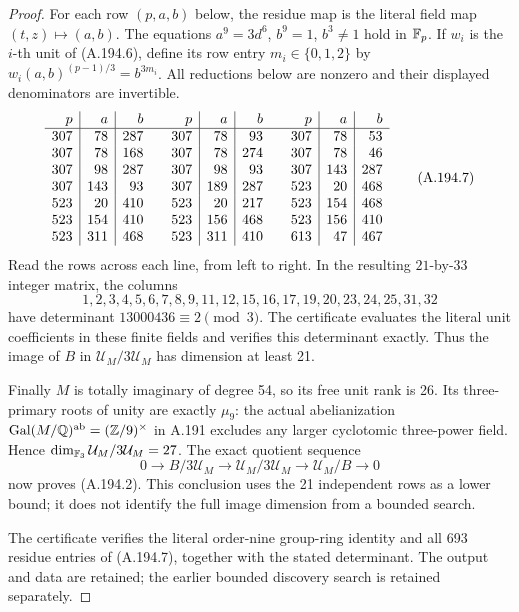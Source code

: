 \begin{proof}
For each row \((p,a,b)\) below, the residue map is the
literal field map \((t,z)\mapsto(a,b)\).
The equations \(a^9=3d^6\), \(b^9=1\), \(b^3\ne1\)
hold in \(\mathbb F_p\).  If \(w_i\) is the \(i\)-th unit
of (A.194.6), define its row entry \(m_i\in\{0,1,2\}\)
by
\(w_i(a,b)^{(p-1)/3}=b^{3m_i}\).
All reductions below are nonzero and their displayed
denominators are invertible.
\[
\begin{array}{r|r|r@{\qquad}r|r|r@{\qquad}r|r|r}
 p&a&b&p&a&b&p&a&b\\\hline
307&78&287&307&78&93&307&78&53\\
307&78&168&307&78&274&307&78&46\\
307&98&287&307&98&93&307&143&287\\
307&143&93&307&189&287&523&20&468\\
523&20&410&523&20&217&523&154&468\\
523&154&410&523&156&468&523&156&410\\
523&311&468&523&311&410&613&47&467
\end{array}
\tag{A.194.7}
\]
Read the rows across each line, from left to right.
In the resulting \(21\)-by-\(33\) integer matrix, the
columns
\[
 1,2,3,4,5,6,7,8,9,11,12,15,16,17,19,20,23,24,25,31,32
\tag{A.194.8}
\]
have determinant \(13000436\equiv2\pmod3\).
The certificate evaluates the literal unit coefficients in
these finite fields and verifies this determinant exactly.
Thus the image of \(B\) in \(\mathcal U_M/3\mathcal U_M\)
has dimension at least 21.

Finally \(M\) is totally imaginary of degree 54, so its
free unit rank is 26.  Its three-primary roots of unity
are exactly \(\mu_9\): the actual abelianization
\(\operatorname{Gal}(M/\mathbb Q)^{\rm ab}=(\mathbb Z/9)^\times\)
in A.191 excludes any larger cyclotomic three-power field.
Hence \(\dim_{\mathbb F_3}\mathcal U_M/3\mathcal U_M=27\).
The exact quotient sequence
\[
 0\longrightarrow B/3\mathcal U_M
 \longrightarrow\mathcal U_M/3\mathcal U_M
 \longrightarrow\mathcal U_M/B\longrightarrow0
\tag{A.194.9}
\]
now proves (A.194.2).  This conclusion uses the 21 independent
rows as a lower bound; it does not identify the full image
dimension from a bounded search.

The certificate
verifies the literal
order-nine group-ring identity and all 693 residue entries
of (A.194.7), together with the stated determinant.  The
output and data are retained; the earlier bounded discovery
search is retained separately.
\end{proof}
